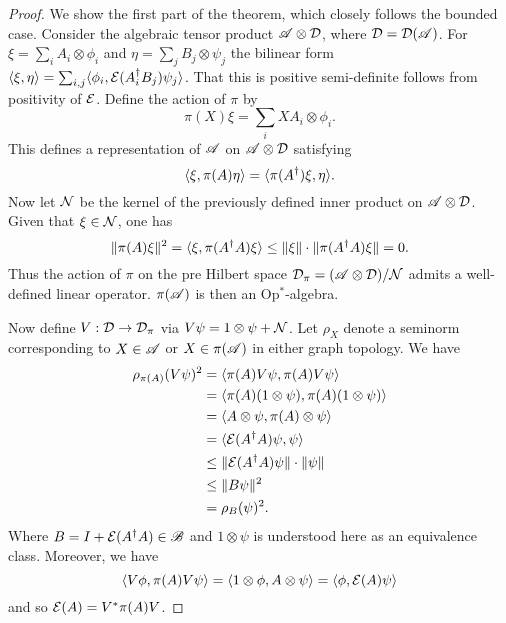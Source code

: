 \documentclass[../main.tex]{subfiles}
\begin{document}
\begin{proof}
	We show the first part of the theorem, which closely follows the bounded case. Consider the algebraic tensor product 
	$\mathscr{A} \otimes \mathcal{D}$, where $\mathcal{D} = \mathcal{D}(\mathscr{A})$. For $\xi = \sum_i A_i \otimes \phi_i$ and 
	$\eta = \sum_j B_j \otimes \psi_j$ the bilinear form $\langle \xi, \eta \rangle = \sum_{i, j}\langle \phi_i, \mathcal{E}(A^\dagger_iB_j)\psi_j \rangle$.
	That this is positive semi-definite follows from positivity of $\mathcal{E}$. Define the action of $\pi$ by 
	\[\pi(X)\xi = \sum_i XA_i \otimes \phi_i.\] This defines a representation of $\mathscr{A}$ on $\mathscr{A} \otimes \mathcal{D}$ satisfying
	\[\langle \xi, \pi(A)\eta \rangle = \langle \pi(A^\dagger)\xi, \eta \rangle.\] Now let $\mathcal{N}$ be the kernel of the previously defined inner product
	on $\mathscr{A} \otimes \mathcal{D}$. Given that $\xi \in \mathcal{N}$, one has
	\[\|\pi(A)\xi\|^2 = \langle \xi, \pi(A^\dagger A)\xi \rangle \le \|\xi\|\cdot\|\pi(A^\dagger A)\xi\| = 0.\]
	Thus the action of $\pi$ on the pre Hilbert space $\mathcal{D}_\pi = (\mathscr{A} \otimes \mathcal{D})/\mathcal{N}$ admits a well-defined 
	linear operator. $\pi(\mathscr{A})$ is then an Op$^*$-algebra.

	Now define $V:\mathcal{D} \to \mathcal{D_\pi}$ via $V\psi = 1 \otimes \psi + \mathcal{N}$. Let $\rho_X$ denote a seminorm corresponding
	to $X \in \mathscr{A}$ or $X \in \pi(\mathscr{A})$ in either graph topology. We have 
	\begin{align*}
	\rho_{\pi(A)}(V\psi)^2 &= \ip{\pi(A)V\psi}{\pi(A)V\psi} \\
	&= \ip{\pi(A)(1 \otimes \psi)}{\pi(A)(1 \otimes \psi)} \\
	&= \ip{A \otimes \psi}{\pi(A) \otimes \psi} \\
	&= \ip{\mc{E}(A^\dagger A)\psi}{\psi} \\
	&\le \|\mc{E}(A^\dagger A)\psi\|\cdot\|\psi\| \\
	&\le \|B\psi\|^2 \\
	&= \rho_B(\psi)^2.
	\end{align*}
	Where $B = I + \mathcal{E}(A^\dagger A) \in \mathscr{B}$ and $1 \otimes \psi$ is understood here as an equivalence class. Moreover, 
	we have \[\langle V\phi, \pi(A)V\psi \rangle = \langle 1 \otimes \phi, A \otimes \psi \rangle = \langle \phi, \mathcal{E}(A)\psi \rangle\] and so 
	$\mathcal{E}(A) = V^*\pi(A)V$. 


\end{proof}
\end{document}

